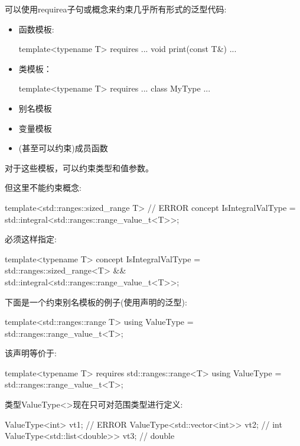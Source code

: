 

可以使用requirea子句或概念来约束几乎所有形式的泛型代码:

\begin{itemize}
\item
函数模板:
\begin{cpp}
template<typename T>
requires ...
void print(const T&) {
	...
}
\end{cpp}

\item
类模板：
\begin{cpp}
template<typename T>
requires ...
class MyType {
	...
}
\end{cpp}

\item
别名模板

\item
变量模板

\item
(甚至可以约束)成员函数
\end{itemize}

对于这些模板，可以约束类型和值参数。

但这里不能约束概念:

\begin{cpp}
template<std::ranges::sized_range T> // ERROR
concept IsIntegralValType = std::integral<std::ranges::range_value_t<T>>;
\end{cpp}

必须这样指定:

\begin{cpp}
template<typename T>
concept IsIntegralValType = std::ranges::sized_range<T> &&
							std::integral<std::ranges::range_value_t<T>>;
\end{cpp}



下面是一个约束别名模板的例子(使用声明的泛型):

\begin{cpp}
template<std::ranges::range T>
using ValueType = std::ranges::range_value_t<T>;
\end{cpp}

该声明等价于:

\begin{cpp}
template<typename T>
requires std::ranges::range<T>
using ValueType = std::ranges::range_value_t<T>;
\end{cpp}

类型ValueType<>现在只可对范围类型进行定义:

\begin{cpp}
ValueType<int> vt1; // ERROR
ValueType<std::vector<int>> vt2; // int
ValueType<std::list<double>> vt3; // double
\end{cpp}

